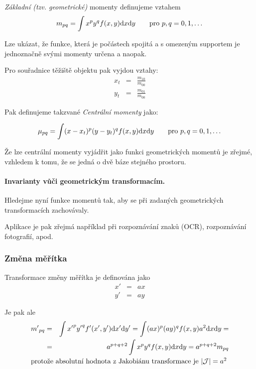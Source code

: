 \def\d{{\rm d}}
{\em Základní (tzv. geometrické)} momenty definujeme vztahem
\begin{equation}
m_{pq}=\int x^py^qf(x,y)\d x\d y\qquad \hbox{pro $p,q=0,1,\dots$}
\end{equation}

Lze ukázat, že funkce, která je počástech spojitá a s omezeným supportem je jednoznačně svými momenty určena
a naopak.

Pro souřadnice těžiště objektu pak vyjdou vztahy:
\begin{eqnarray}
x_t&=&\frac{m_{10}}{m_{00}}\nonumber\\
y_t&=&\frac{m_{01}}{m_{00}}
\end{eqnarray}

Pak definujeme takzvané {\em Centrální momenty}  jako:

\begin{equation}
\mu_{pq}=\int (x-x_t)^p(y-y_t)^qf(x,y)\d x\d y\qquad \hbox{pro $p,q=0,1,\dots$}
\end{equation}

Že lze centrální momenty vyjádřit jako funkci geometrických momentů je zřejmé, vzhledem k tomu, že se jedná o dvě 
báze stejného prostoru.

\paragraph{Invarianty vůči geometrickým transformacím.}
Hledejme nyní funkce momentů tak, aby se při zadaných geometrických transformacích zachovávaly. 

Aplikace je pak zřejmá například při rozpoznávání znaků (OCR), rozpoznávání fotografií, apod.

\subsubsection{Změna měřítka}
Transformace změny měřítka je definována jako
\begin{eqnarray}
x'&=&ax\nonumber\\
y'&=&ay
\end{eqnarray}

Je pak ale
\begin{eqnarray}
{m'}_{pq}&=&\int {x'}^p{y'}^q{f'}(x',y')\d x'\d y'=\int (ax)^p(ay)^qf(x,y)a^2\d x\d y=\nonumber\\
&=&a^{p+q+2}\int x^py^qf(x,y)\d x\d y=a^{p+q+2} m_{pq}\\
\noalign{\hbox{protože absolutní hodnota z Jakobiánu transformace je $|\mathcal{J}|=a^2$}}\nonumber
\end{eqnarray}

